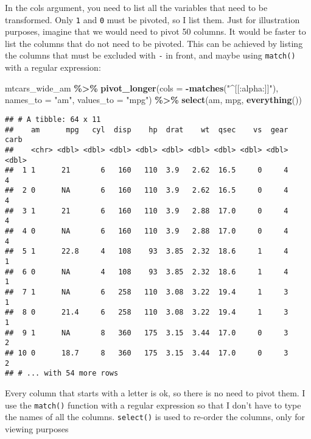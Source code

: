 \documentclass[
]{article}
\newenvironment{Shaded}{\begin{snugshade}}{\end{snugshade}}
\newcommand{\DataTypeTok}[1]{\textcolor[rgb]{0.13,0.29,0.53}{#1}}
\newcommand{\KeywordTok}[1]{\textcolor[rgb]{0.13,0.29,0.53}{\textbf{#1}}}
\newcommand{\NormalTok}[1]{#1}
\newcommand{\OperatorTok}[1]{\textcolor[rgb]{0.81,0.36,0.00}{\textbf{#1}}}
\newcommand{\StringTok}[1]{\textcolor[rgb]{0.31,0.60,0.02}{#1}}
\begin{document}
In the cols argument, you need to list all the variables that need to be transformed. Only \texttt{1} and
\texttt{0} must be pivoted, so I list them. Just for illustration purposes, imagine that we would need
to pivot 50 columns. It would be faster to list the columns that do not need to be pivoted. This
can be achieved by listing the columns that must be excluded with \texttt{-} in front, and maybe using
\texttt{match()} with a regular expression:

\begin{Shaded}
\begin{Highlighting}[]
\NormalTok{mtcars\_wide\_am }\OperatorTok{\%\textgreater{}\%}\StringTok{ }
\StringTok{  }\KeywordTok{pivot\_longer}\NormalTok{(}\DataTypeTok{cols =} \OperatorTok{{-}}\KeywordTok{matches}\NormalTok{(}\StringTok{"\^{}[[:alpha:]]"}\NormalTok{), }\DataTypeTok{names\_to =} \StringTok{"am"}\NormalTok{, }\DataTypeTok{values\_to =} \StringTok{"mpg"}\NormalTok{) }\OperatorTok{\%\textgreater{}\%}\StringTok{ }
\StringTok{  }\KeywordTok{select}\NormalTok{(am, mpg, }\KeywordTok{everything}\NormalTok{())}
\end{Highlighting}
\end{Shaded}

\begin{verbatim}
## # A tibble: 64 x 11
##    am      mpg   cyl  disp    hp  drat    wt  qsec    vs  gear  carb
##    <chr> <dbl> <dbl> <dbl> <dbl> <dbl> <dbl> <dbl> <dbl> <dbl> <dbl>
##  1 1      21       6   160   110  3.9   2.62  16.5     0     4     4
##  2 0      NA       6   160   110  3.9   2.62  16.5     0     4     4
##  3 1      21       6   160   110  3.9   2.88  17.0     0     4     4
##  4 0      NA       6   160   110  3.9   2.88  17.0     0     4     4
##  5 1      22.8     4   108    93  3.85  2.32  18.6     1     4     1
##  6 0      NA       4   108    93  3.85  2.32  18.6     1     4     1
##  7 1      NA       6   258   110  3.08  3.22  19.4     1     3     1
##  8 0      21.4     6   258   110  3.08  3.22  19.4     1     3     1
##  9 1      NA       8   360   175  3.15  3.44  17.0     0     3     2
## 10 0      18.7     8   360   175  3.15  3.44  17.0     0     3     2
## # ... with 54 more rows
\end{verbatim}

Every column that starts with a letter is ok, so there is no need to pivot them. I use the \texttt{match()}
function with a regular expression so that I don't have to type the names of all the columns. \texttt{select()}
is used to re-order the columns, only for viewing purposes
\end{document}

